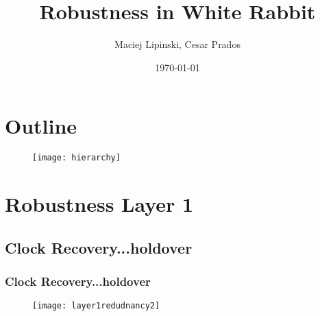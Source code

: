 \documentclass[]{beamer}
\title{Robustness in White Rabbit}    %
\author{Maciej Lipinski, Cesar Prados}                 %
\institute{CERN \&  GSI}      %
\date{\today}                    %
\begin{document}
\begin{frame}
\end{frame}

\section*{Outline}
\begin{frame}
  \tableofcontents
\end{frame}

\begin{frame}
\begin{figure}[tbp] %
  \centering
  \texttt{[image: hierarchy]}
  \label{fig:hierarchy}
\end{figure}

\end{frame}

\section{Robustness Layer 1}

\subsection{Clock Recovery...holdover}

\begin{frame}
  \frametitle{Clock Recovery...holdover}   %
\begin{figure}[tbp] %
  \centering

  \texttt{[image: layer1redudnancy2]}



\end{figure}
\end{frame}
\end{document}
